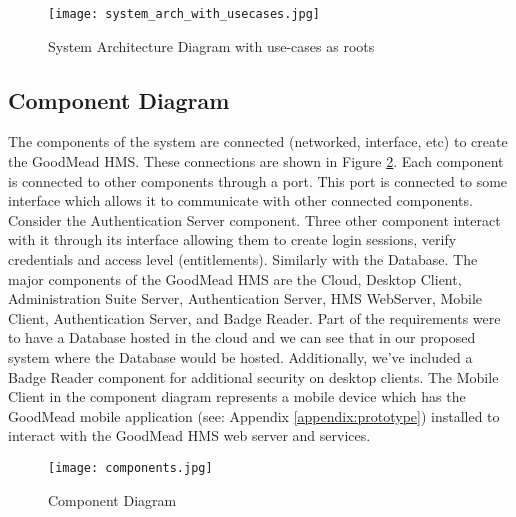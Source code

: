 \documentclass[a4paper, 11pt]{article}
\begin{document}
\begin{figure}[!htb]
    \centering
    \texttt{[image: system\_arch\_with\_usecases.jpg]}
    \caption{System Architecture Diagram with use-cases as roots}
    \label{fig:sys_arch_with_usecases}
\end{figure}
\clearpage
\newpage

\subsection{Component Diagram}
The components of the system are connected (networked, interface, etc) to create the GoodMead HMS. These connections are shown in Figure \ref{fig:components}. Each component is connected to other components through a port. This port is connected to some interface which allows it to communicate with other connected components. Consider the Authentication Server component. Three other component interact with it through its interface allowing them to create login sessions, verify credentials and access level (entitlements). Similarly with the Database.
The major components of the GoodMead HMS are the Cloud, Desktop Client, Administration Suite Server, Authentication Server, HMS WebServer, Mobile Client, Authentication Server, and Badge Reader. Part of the requirements were to have a Database hosted in the cloud and we can see that in our proposed system where the Database would be hosted. Additionally, we've included a Badge Reader component for additional security on desktop clients. The Mobile Client in the component diagram represents a mobile device which has the GoodMead mobile application (see: Appendix \ref{appendix:prototype}) installed to interact with the GoodMead HMS web server and services.


\begin{figure}[!htb]
    \centering
    \texttt{[image: components.jpg]}
    \caption{Component Diagram}
    \label{fig:components}
\end{figure}
\clearpage
\newpage
\end{document}
